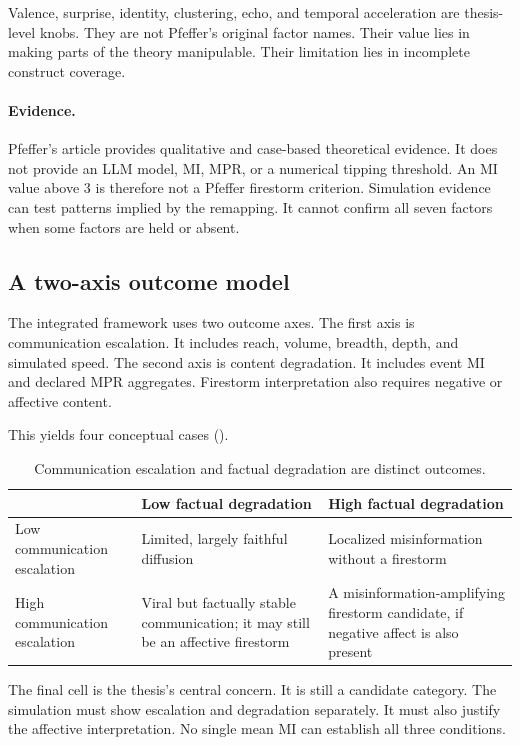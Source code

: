 Valence, surprise, identity, clustering, echo, and temporal acceleration are thesis-level knobs.
They are not Pfeffer's original factor names.
Their value lies in making parts of the theory manipulable.
Their limitation lies in incomplete construct coverage.

\paragraph{Evidence.}
Pfeffer's article provides qualitative and case-based theoretical evidence.
It does not provide an LLM model, MI, MPR, or a numerical tipping threshold.
An MI value above \(3\) is therefore not a Pfeffer firestorm criterion.
Simulation evidence can test patterns implied by the remapping.
It cannot confirm all seven factors when some factors are held or absent.

\subsection{A two-axis outcome model}
\label{subsec:two-axis-model}

The integrated framework uses two outcome axes.
The first axis is communication escalation.
It includes reach, volume, breadth, depth, and simulated speed.
The second axis is content degradation.
It includes event MI and declared MPR aggregates.
Firestorm interpretation also requires negative or affective content.

This yields four conceptual cases ().
\begin{table}[t]
\centering
\caption{Communication escalation and factual degradation are distinct outcomes.}
\label{tab:two-axis-outcomes}
\begin{tabular}{p{}p{}p{}}
\toprule
 & Low factual degradation & High factual degradation \\
\midrule
Low communication escalation
& Limited, largely faithful diffusion
& Localized misinformation without a firestorm \\
High communication escalation
& Viral but factually stable communication; it may still be an affective firestorm
& A misinformation-amplifying firestorm candidate, if negative affect is also present \\
\bottomrule
\end{tabular}
\end{table}

The final cell is the thesis's central concern.
It is still a candidate category.
The simulation must show escalation and degradation separately.
It must also justify the affective interpretation.
No single mean MI can establish all three conditions.

